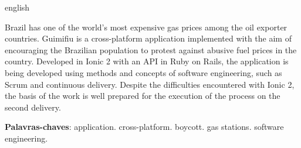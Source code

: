 \begin{resumo}[Abstract]
 \begin{otherlanguage*}{english}

     Brazil has one of the world's most expensive gas prices among the oil exporter countries. Guimifiu is a cross-platform application implemented with the aim of encouraging the Brazilian population to protest against abusive fuel prices in the country. Developed in Ionic 2 with an API in Ruby on Rails, the application is being developed using methods and concepts of software engineering, such as Scrum and continuous delivery. Despite the difficulties encountered with Ionic 2, the basis of the work is well prepared for the execution of the process on the second delivery.

     \vspace{\onelineskip}
        
     \noindent
     \textbf{Palavras-chaves}: application. cross-platform. boycott. gas stations. software engineering. 
 \end{otherlanguage*}
\end{resumo}
